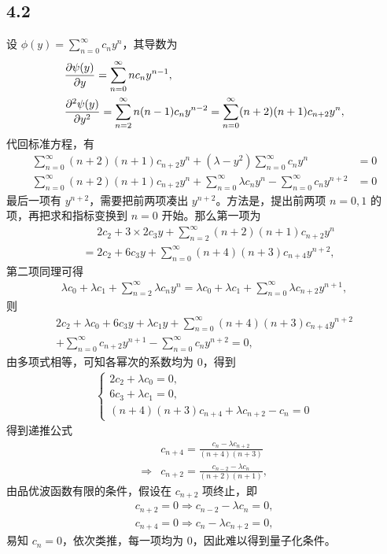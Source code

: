 \subsection{4.2}
设 $\phi(y) = \sum_{n=0}^\infty c_n y^n$，其导数为
\begin{align}
    &\pdv{\psi(y)}{y} = \sum_{n=0}^{\infty} n c_n y^{n-1}, \\
    &\pdv[2]{\psi(y)}{y} = \sum_{n=2}^\infty n(n-1)c_n y^{n-2} = \sum_{n=0}^\infty (n+2)(n+1) c_{n+2} y^n,
\end{align}
代回标准方程，有
\begin{align}
    \sum_{n=0}^\infty (n+2)(n+1) c_{n+2} y^n + (\lambda - y^2)\sum_{n=0}^\infty c_n y^n &= 0 \\
    \sum_{n=0}^\infty (n+2)(n+1) c_{n+2} y^n 
    + \sum_{n=0}^\infty \lambda c_n y^n 
    - \sum_{n=0}^\infty c_n y^{n+2} &= 0
\end{align}
最后一项有 $y^{n+2}$，需要把前两项凑出 $y^{n+2}$。方法是，提出前两项 $n=0,1$ 的项，再把求和指标变换到 $n=0$ 开始。那么第一项为
\begin{align}
    &\phantom{=}2c_2 + 3\times2 c_3 y + \sum_{n=2}^{\infty} (n+2)(n+1) c_{n+2}y^n \\
    &= 2c_2 + 6 c_3 y + \sum_{n=0}^{\infty} (n+4)(n+3) c_{n+4} y^{n+2},
\end{align}
第二项同理可得
\begin{align}
    \lambda c_0 + \lambda c_1 + \sum_{n=2}^\infty \lambda c_{n} y^{n} = \lambda c_0 + \lambda c_1 + \sum_{n=0}^\infty \lambda c_{n+2} y^{n+1},
\end{align}
则
\begin{multline}
    2 c_2 + \lambda c_0 + 6 c_3 y + \lambda c_1 y 
    + \sum_{n=0}^{\infty} (n+4)(n+3) c_{n+4} y^{n+2} \\
    + \sum_{n=0}^\infty c_{n+2} y^{n+1}
    - \sum_{n=0}^\infty c_n y^{n+2} = 0,
\end{multline}
由多项式相等，可知各幂次的系数均为 0，得到
\begin{align}
    \begin{cases}
        2c_2 + \lambda c_0 = 0,\\
        6c_3 + \lambda c_1 = 0,\\
        (n+4)(n+3) c_{n+4} + \lambda c_{n+2} - c_n = 0
    \end{cases}
\end{align}
得到递推公式
\begin{align}
    &c_{n+4} = \frac{c_n - \lambda c_{n+2}}{(n+4) (n+3)}\\
    \Rightarrow {}&c_{n+2} = \frac{c_{n-2} - \lambda c_{n}}{(n+2) (n+1)},
\end{align}
由品优波函数有限的条件，假设在 $c_{n+2}$ 项终止，即
\begin{align}
    c_{n+2} = 0 \Rightarrow c_{n-2} - \lambda c_n = 0, \\
    c_{n+4} = 0 \Rightarrow c_n - \lambda c_{n+2} = 0,
\end{align}
易知 $c_n =0$，依次类推，每一项均为 0，因此难以得到量子化条件。

